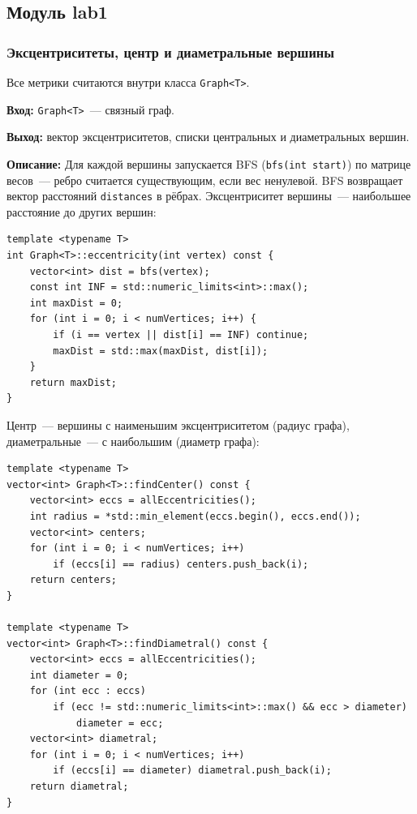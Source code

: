 \subsection{Модуль lab1}

\subsubsection{Эксцентриситеты, центр и диаметральные вершины}

Все метрики считаются внутри класса \texttt{Graph<T>}.

\textbf{Вход:} \texttt{Graph<T>}~--- связный граф.

\textbf{Выход:} вектор эксцентриситетов, списки центральных и диаметральных вершин.

\textbf{Описание:} Для каждой вершины запускается BFS (\texttt{bfs(int start)})
по матрице весов~--- ребро считается существующим, если вес ненулевой.
BFS возвращает вектор расстояний \texttt{distances} в рёбрах.
Эксцентриситет вершины~--- наибольшее расстояние до других вершин:

\begin{lstlisting}[style=cstyle, caption={BFS и вычисление эксцентриситета (graph.cpp)}]
template <typename T>
int Graph<T>::eccentricity(int vertex) const {
    vector<int> dist = bfs(vertex);
    const int INF = std::numeric_limits<int>::max();
    int maxDist = 0;
    for (int i = 0; i < numVertices; i++) {
        if (i == vertex || dist[i] == INF) continue;
        maxDist = std::max(maxDist, dist[i]);
    }
    return maxDist;
}
\end{lstlisting}

Центр~--- вершины с наименьшим эксцентриситетом (радиус графа),
диаметральные~--- с наибольшим (диаметр графа):

\begin{lstlisting}[style=cstyle, caption={Поиск центра и диаметральных вершин (graph.cpp)}]
template <typename T>
vector<int> Graph<T>::findCenter() const {
    vector<int> eccs = allEccentricities();
    int radius = *std::min_element(eccs.begin(), eccs.end());
    vector<int> centers;
    for (int i = 0; i < numVertices; i++)
        if (eccs[i] == radius) centers.push_back(i);
    return centers;
}

template <typename T>
vector<int> Graph<T>::findDiametral() const {
    vector<int> eccs = allEccentricities();
    int diameter = 0;
    for (int ecc : eccs)
        if (ecc != std::numeric_limits<int>::max() && ecc > diameter)
            diameter = ecc;
    vector<int> diametral;
    for (int i = 0; i < numVertices; i++)
        if (eccs[i] == diameter) diametral.push_back(i);
    return diametral;
}
\end{lstlisting}

